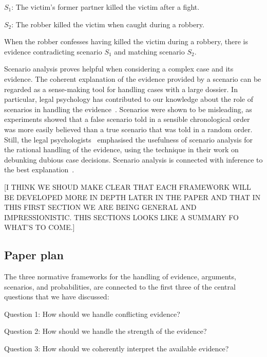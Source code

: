 \documentclass[10pt]{article}
\begin{document}
\begin{description}
	\item $S_1$: The victim's former partner killed the victim after a fight.
	\item $S_2$: The robber killed the victim when caught during a robbery.	
\end{description}

\noindent When the robber confesses having killed the victim during a robbery, there is evidence contradicting scenario $S_1$ and matching scenario $S_2$.

Scenario analysis proves helpful when considering a complex case and its evidence. The coherent explanation of the evidence provided by a scenario can be regarded as a sense-making tool for handling cases with a large dossier. In particular, legal psychology has contributed to our knowledge about the role of scenarios in handling the evidence~\citep{bennettFeldman1981,penningtonHastie1993}. Scenarios were shown to be misleading, as experiments showed that a false scenario told in a sensible chronological order was more easily believed than a true scenario that was told in a random order. Still, the legal psychologists~\citet{wagenaarEtal1993} emphasised the usefulness of scenario analysis for the rational handling of the evidence, using the technique in their work on debunking dubious case decisions. Scenario analysis is connected with inference to the best explanation~\citep{pardoAllen2008}.

[I THINK WE SHOUD MAKE CLEAR THAT EACH FRAMEWORK WILL BE 
DEVELOPED MORE IN DEPTH LATER IN THE PAPER AND THAT IN THIS FIRST SECTION WE ARE 
BEING GENERAL AND IMPRESSIONISTIC. THIS SECTIONS LOOKS LIKE 
A SUMMARY FO WHAT'S TO COME.]

\subsection{Paper plan}

The three normative frameworks for the handling of evidence, arguments, scenarios, and probabilities, are connected to the first three of the central questions that we have discussed:

\begin{description}
	\item Question 1: How should we handle conflicting evidence?
	\item Question 2: How should we handle the strength of the evidence?
	\item Question 3: How should we coherently interpret the available evidence? 
\end{description}
\end{document}
